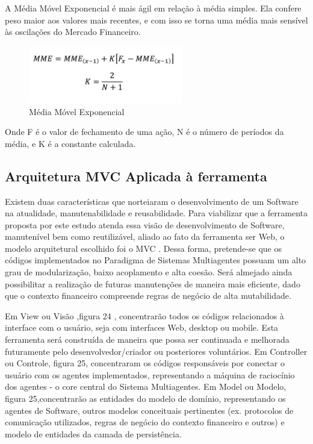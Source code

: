 A Média Móvel Exponencial é mais ágil em relação à média simples. Ela confere peso maior aos valores mais recentes, e com isso se torna uma média mais sensível às oscilações do Mercado Financeiro.

\begin{figure}[h]
\centering
\label{f23}
\includegraphics[width=0.6\textwidth]{figuras/f23}
\caption{Média Móvel Exponencial}
\end{figure}


Onde F é o valor de fechamento de uma ação, N é o número de períodos da média, e K é a constante calculada.

\subsection{Arquitetura MVC Aplicada à ferramenta}

Existem duas características que norteiaram o desenvolvimento de um Software na atualidade, manutenabilidade e reusabilidade. Para viabilizar que a ferramenta proposta por este estudo atenda essa visão de desenvolvimento de Software, manutenível bem como reutilizável, aliado ao fato da ferramenta ser Web, o modelo arquitetural escolhido foi o MVC \cite{krasner1988}. Dessa forma, pretende-se que os códigos implementados no Paradigma de Sistemas Multiagentes possuam um alto grau de modularização, baixo acoplamento e alta coesão. Será almejado ainda possibilitar a realização de futuras manutenções de maneira mais eficiente, dado que o contexto financeiro compreende regras de negócio de alta mutabilidade. 

Em View ou Visão ,figura 24 , concentrarão todos os códigos relacionados à interface com o usuário, seja com interfaces Web, desktop ou mobile. Esta ferramenta será construída de maneira que possa ser continuada e melhorada futuramente pelo desenvolvedor/criador ou posteriores voluntários. Em Controller ou Controle, figura 25, concentraram os códigos responsáveis por conectar o usuário com os agentes implementados, representando a máquina de raciocínio dos agentes - o core central do Sistema Multiagentes. Em Model ou Modelo, figura 25,concentrarão as entidades do modelo de domínio, representando os agentes de Software, outros modelos conceituais pertinentes (ex. protocolos de comunicação utilizados, regras de negócio do contexto financeiro e outros) e modelo de entidades da camada de persistência.

